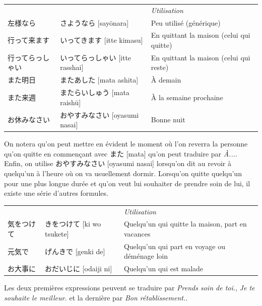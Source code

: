 \documentclass[a4paper,11pt,final]{article}
\newcommand{\sectit}[1]{\bigskip\hspace{-5mm}{\color{sectionblue}$\blacksquare$~~\Large\bfseries #1}}
\newcommand{\romaji}[1]{{\footnotesize[#1]}}
\begin{document}
\hspace{5mm}\begin{tabular}{|p{3.25cm}p{5cm}l}
	\multicolumn{1}{l}{}&& \it\small Utilisation \\
	左様なら			& さようなら \romaji{say\=onara}			& Peu utilisé (générique) \\
	行って来ます		& いってきます \romaji{itte kimasu}		& En quittant la maison (celui qui quitte) \\
	行ってらっしゃい	& いってらっしゃい \romaji{itte rasshai}	& En quittant la maison (celui qui reste) \\
	また明日			& またあした \romaji{mata ashita}			& À demain \\
	また来週			& またらいしゅう \romaji{mata raish\=u}	& À la semaine prochaine \\
	お休みなさい		& おやすみなさい \romaji{oyasumi nasai}	& Bonne nuit
\end{tabular}

On notera qu'on peut mettre en évident le moment où l'on reverra la personne qu'on quitte en commençant avec また \romaji{mata} qu'on peut traduire par \og\textit{À...}\fg. Enfin, on utilise おやすみなさい \romaji{oyasumi nasai} lorsqu'on dit au revoir à quelqu'un à l'heure où on va usuellement dormir. Lorsqu'on quitte quelqu'un pour une plus longue durée et qu'on veut lui souhaiter de prendre soin de lui, il existe une série d'autres formules.

\hspace{5mm}\begin{tabular}{|p{2.5cm}p{5cm}l}
	\multicolumn{1}{l}{}&& \it\small Utilisation \\
	気をつけて		& きをつけて \romaji{ki wo tsukete}		& Quelqu'un qui quitte la maison, part en vacances  \\
	元気で			& げんきで \romaji{genki de}				& Quelqu'un qui part en voyage ou déménage loin \\
	お大事に			& おだいじに \romaji{odaiji ni}			& Quelqu'un qui est malade
\end{tabular}

Les deux premières expressions peuvent se traduire par \og\textit{Prends soin de toi.}\fg{}, \og\textit{Je te souhaite le meilleur.}\fg{} et la dernière par \og\textit{Bon rétablissement.}\fg{}.


\sectit{Discours informel}
\end{document}
